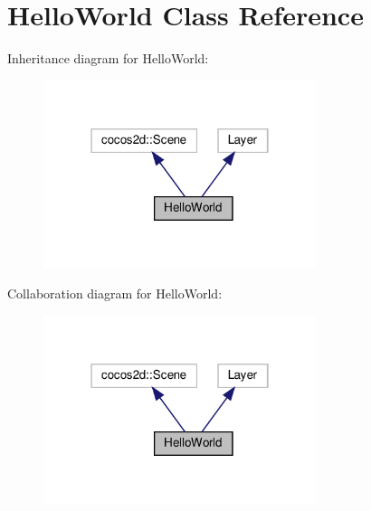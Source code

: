 \hypertarget{classHelloWorld}{}\section{Hello\+World Class Reference}
\label{classHelloWorld}


Inheritance diagram for Hello\+World\+:
\nopagebreak
\begin{figure}[H]
\begin{center}
\leavevmode
\includegraphics[width=226pt]{classHelloWorld__inherit__graph}
\end{center}
\end{figure}


Collaboration diagram for Hello\+World\+:
\nopagebreak
\begin{figure}[H]
\begin{center}
\leavevmode
\includegraphics[width=226pt]{classHelloWorld__coll__graph}
\end{center}
\end{figure}

